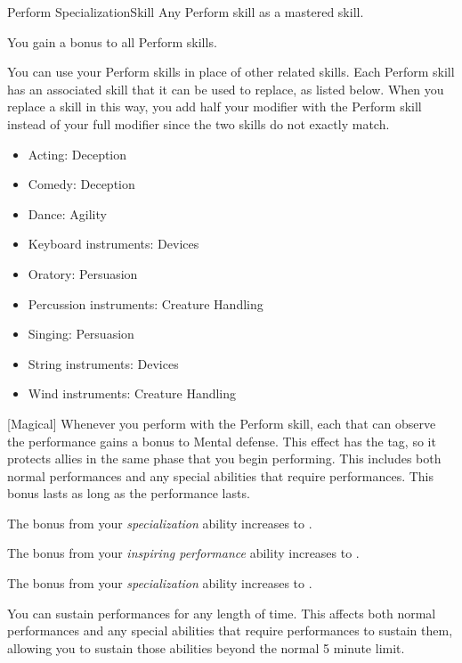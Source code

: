     \begin{feat}{Perform Specialization}{Skill}
        \featpre Any Perform skill as a mastered skill.

         You gain a  bonus to all Perform skills.

         You can use your Perform skills in place of other related skills.
        Each Perform skill has an associated skill that it can be used to replace, as listed below.
        When you replace a skill in this way, you add half your modifier with the Perform skill instead of your full modifier since the two skills do not exactly match.
        \begin{itemize}
            \item Acting: Deception
            \item Comedy: Deception
            \item Dance: Agility
            \item Keyboard instruments: Devices
            \item Oratory: Persuasion
            \item Percussion instruments: Creature Handling
            \item Singing: Persuasion
            \item String instruments: Devices
            \item Wind instruments: Creature Handling
        \end{itemize}

        [Magical] Whenever you perform with the Perform skill, each  that can observe the performance gains a  bonus to Mental defense.
        This effect has the  tag, so it protects allies in the same phase that you begin performing.
        This includes both normal performances and any special abilities that require performances.
        This bonus lasts as long as the performance lasts.

         The bonus from your \textit{specialization} ability increases to .

         The bonus from your \textit{inspiring performance} ability increases to .

         The bonus from your \textit{specialization} ability increases to .

         You can sustain performances for any length of time.
        This affects both normal performances and any special abilities that require performances to sustain them, allowing you to sustain those abilities beyond the normal 5 minute limit.
    \end{feat}

